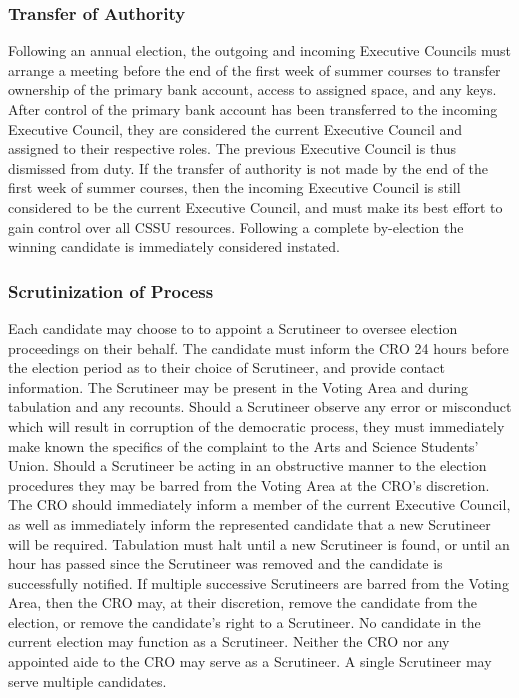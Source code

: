\documentclass{article}
\begin{document}
\subsubsection{Transfer of Authority} \label{sec:3.10.5}
Following an annual election, the outgoing and incoming Executive Councils must arrange a meeting before the end of the first week of summer courses to transfer ownership of the primary bank account, access to assigned space, and any keys. After control of the primary bank account has been transferred to the incoming Executive Council, they are considered the current Executive Council and assigned to their respective roles. The previous Executive Council is thus dismissed from duty. If the transfer of authority is not made by the end of the first week of summer courses, then the incoming Executive Council is still considered to be the current Executive Council, and must make its best effort to gain control over all CSSU resources. Following a complete by-election the winning candidate is immediately considered instated.
\subsubsection{Scrutinization of Process} \label{sec:3.10.6}
Each candidate may choose to to appoint a Scrutineer to oversee election proceedings on their behalf. The candidate must inform the CRO 24 hours before the election period as to their choice of Scrutineer, and provide contact information. The Scrutineer may be present in the Voting Area and during tabulation and any recounts. Should a Scrutineer observe any error or misconduct which will result in corruption of the democratic process, they must immediately make known the specifics of the complaint to the Arts and Science Students’ Union. Should a Scrutineer be acting in an obstructive manner to the election procedures they may be barred from the Voting Area at the CRO’s discretion. The CRO should immediately inform a member of the current Executive Council, as well as immediately inform the represented candidate that a new Scrutineer will be required. Tabulation must halt until a new Scrutineer is found, or until an hour has passed since the Scrutineer was removed and the candidate is successfully notified. If multiple successive Scrutineers are barred from the Voting Area, then the CRO may, at their discretion, remove the candidate from the election, or remove the candidate's right to a Scrutineer. No candidate in the current election may function as a Scrutineer. Neither the CRO nor any appointed aide to the CRO may serve as a Scrutineer. A single Scrutineer may serve multiple candidates.
\end{document}
